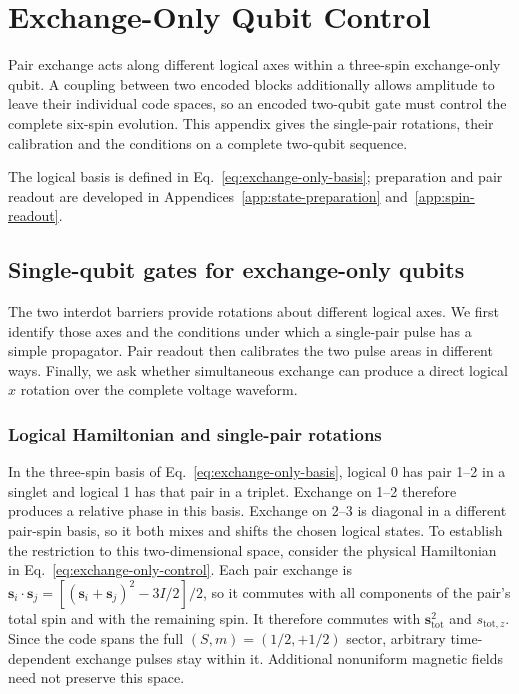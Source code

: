 \FloatBarrier
\section{Exchange-Only Qubit Control}
\label{app:exchange-only-control}

Pair exchange acts along different logical axes within a three-spin
exchange-only qubit. A coupling between two encoded blocks additionally
allows amplitude to leave their individual code spaces, so an encoded
two-qubit gate must control the complete six-spin evolution. This
appendix gives the single-pair rotations, their calibration and the
conditions on a complete two-qubit sequence.

The logical basis is defined in Eq.~\eqref{eq:exchange-only-basis};
preparation and pair readout are developed in
Appendices~\ref{app:state-preparation} and~\ref{app:spin-readout}.

\subsection{Single-qubit gates for exchange-only qubits}
\label{sec:calibration-eo-rotations}
\label{sec:measurement-eo-exchange}
The two interdot barriers provide rotations about different logical
axes. We first identify those axes and the conditions under which a
single-pair pulse has a simple propagator. Pair readout then
calibrates the two pulse areas in different ways. Finally, we ask
whether simultaneous exchange can produce a direct logical $x$
rotation over the complete voltage waveform.

\subsubsection{Logical Hamiltonian and single-pair rotations}
\label{sec:calibration-eo-logical-axes}

In the three-spin basis of Eq.~\eqref{eq:exchange-only-basis},
logical 0 has pair 1--2 in a singlet and logical 1 has that pair
in a triplet. Exchange on 1--2 therefore produces a relative
phase in this basis. Exchange on 2--3 is diagonal in a different
pair-spin basis, so it both mixes and shifts the chosen logical
states. To establish the restriction to this two-dimensional
space, consider the physical Hamiltonian in
Eq.~\eqref{eq:exchange-only-control}. Each pair exchange is
$\mathbf{s}_i\cdot\mathbf{s}_j
=[(\mathbf{s}_i+\mathbf{s}_j)^2-3I/2]/2$,
so it commutes with all components of the pair's total spin and
with the remaining spin. It therefore commutes with
$\mathbf{s}_{\mathrm{tot}}^2$ and $s_{\mathrm{tot},z}$.
Since the code spans the full $(S,m)=(1/2,+1/2)$ sector,
arbitrary time-dependent exchange pulses stay within it.
Additional nonuniform magnetic fields need not preserve this space.

